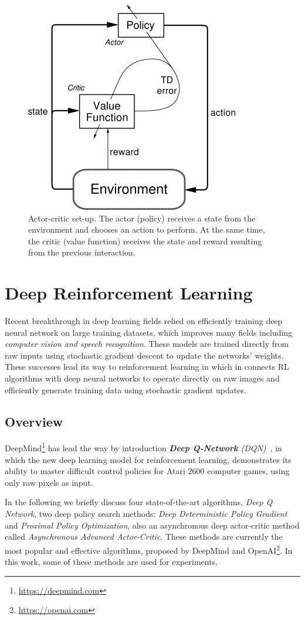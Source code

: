 \begin{figure}[H]
	\centering
		\includegraphics[width=.3\linewidth]{figures/actor_critic.png}
		\caption{Actor-critic set-up. The actor (policy) receives a state from the environment and chooses an action to perform. At the same time, the critic (value function) receives the state and reward resulting from the previous interaction.~\parencite{arulkumaran2017brief}}
		\label{fig:actor_critic}
\end{figure}



\section{Deep Reinforcement Learning}

Recent breakthrough in deep learning fields relied on efficiently training deep neural network on large training datasets, which improves many fields including \textit{computer vision and speech recognition}. These models are trained directly from raw inputs using stochastic gradient descent to update the networks' weights. These successes lead its way to reinforcement learning in which in connects RL algorithms with deep neural networks to operate directly on raw images and efficiently generate training data using stochastic gradient updates.

\subsection{Overview}
DeepMind\footnote{\url{https://deepmind.com}\label{deepmind}} has lead the way by introduction \textit{\textbf{Deep Q-Network} (DQN)}~\parencite{mnih2015human}, in which the new deep learning model for reinforcement learning, demonstrates its ability to master difficult control policies for Atari 2600 computer games, using only raw pixels as input.

In the following we briefly discuss four state-of-the-art algorithms, \textit{Deep Q Network}, two deep policy search methods: \textit{Deep Deterministic Policy Gradient} and \textit{Proximal Policy Optimization}, also an asynchronous deep actor-critic method called \textit{Asynchronous Advanced Actor-Critic}.
These methods are currently the most popular and effective algorithms, proposed by DeepMind and OpenAI\footnote{\url{https://openai.com}}. In this work, some of these methods are used for experiments.

